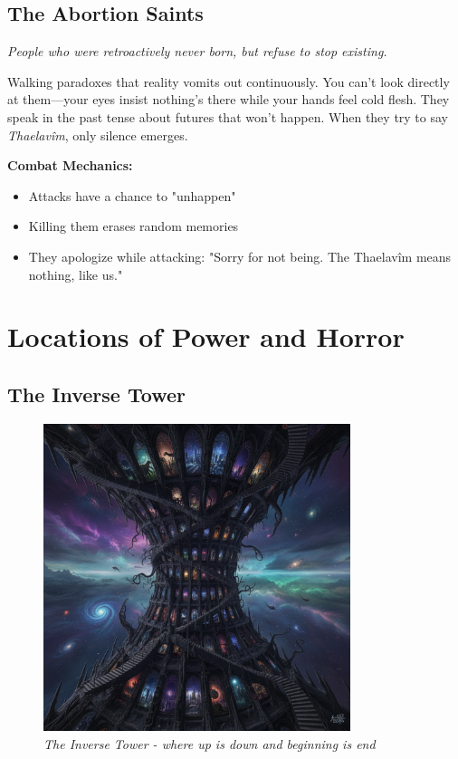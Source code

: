 \documentclass[11pt,a4paper,twoside]{book}
\begin{document}
\section{The Abortion Saints}

\begin{adjustwidth}{1em}{1em}
\textit{People who were retroactively never born, but refuse to stop existing.}
\end{adjustwidth}

Walking paradoxes that reality vomits out continuously. You can't look directly at them—your eyes insist nothing's there while your hands feel cold flesh. They speak in the past tense about futures that won't happen. When they try to say \textit{Thaelavîm}, only silence emerges.

\textbf{Combat Mechanics:}
\begin{itemize}
    \item Attacks have a chance to "unhappen"
    \item Killing them erases random memories
    \item They apologize while attacking: "Sorry for not being. The Thaelavîm means nothing, like us."
\end{itemize}

\chapter{Locations of Power and Horror}

\section{The Inverse Tower}

\begin{figure}[h]
\centering
\includegraphics[width=0.8\textwidth]{images/inverse_tower_2025-09-03T22-30-56-469Z_1.png}
\caption*{\textit{The Inverse Tower - where up is down and beginning is end}}
\end{figure}
\end{document}
